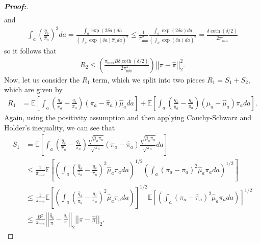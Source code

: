 \documentclass[11pt,twoside]{article}
\theoremstyle{definition}
\theoremstyle{remark}
\begin{document}
\begin{proof}[\textbf{Proof:}]
\begin{align*}
\end{align*}
and
\begin{align*}
    \int_a \left(\frac{\widehat{q}_\delta}{\widehat{\pi}_a}\right)^2 da =   \frac{\int_a \exp(2 \delta a)  da}{\left(\int_a \exp(\delta a) \widehat{\pi}_a  da \right)^2} \leq \frac{1}{\pi_{\min}^2} \frac{\int_a \exp(2 \delta a) da}{\left(\int_a \exp(\delta a) da \right)^2} = \frac{\delta  \coth(\delta / 2)}{2 \pi_{\min}^2}
\end{align*}
so it follows that
\begin{align*}
    R_2 \leq   \left(\frac{\pi_{\max} B  \delta  \coth(\delta / 2)}{2 \pi^4_{\min}} \right)   \left| \left|\pi - \widehat{\pi} \right| \right|^2_2.
\end{align*}
Now, let us consider the $R_1$ term, which we split into two pieces $R_1 = S_1 + S_2$, which are given by
\begin{align*}
    R_1 &= \mathbb{E} \left[\int_a \left(\frac{\widehat{q}_\delta}{\widehat{\pi}_a} - \frac{q_\delta}{\pi_a} \right)(\pi_a - \widehat{\pi}_a) \widehat{\mu}_a da \right] + \mathbb{E} \left[\int_a \left(\frac{\widehat{q}_\delta}{\widehat{\pi}_a} - \frac{q_\delta}{\pi_a} \right) (\mu_a - \widehat{\mu}_a) \pi_a  da\right].
\end{align*}
Again, using the positivity assumption and then applying Cauchy-Schwarz and Holder's inequality, we can see that
\begin{align*}
    S_1 &= \mathbb{E} \left[\int_a \left(\frac{\widehat{q}_\delta}{\widehat{\pi}_a} - \frac{q_\delta}{\pi_a} \right) \frac{\sqrt{\widehat{\mu}_a \pi_a}}{\sqrt{\pi_a}} (\pi_a - \widehat{\pi}_a)  \frac{\sqrt{\widehat{\mu}_a \pi_a}}{\sqrt{\pi_a}} da \right] \\
    &\leq \frac{1}{\pi_{\min}}\mathbb{E} \left[\left(\int_a \left(\frac{\widehat{q}_\delta}{\widehat{\pi}_a} - \frac{q_\delta}{\pi_a} \right)^2 \widehat{\mu}_a \pi_a da \right)^{1/2} \left( \int_a (\pi_a - \widehat{\pi}_a)^2   \widehat{\mu}_a \pi_a da \right)^{1/2} \right] \\
    &\leq \frac{1}{\pi_{\min}}\mathbb{E} \left[\left(\int_a \left(\frac{\widehat{q}_\delta}{\widehat{\pi}_a} - \frac{q_\delta}{\pi_a} \right)^2 \widehat{\mu}_a \pi_a da \right)\right]^{1/2} \mathbb{E} \left[ \left( \int_a (\pi_a - \widehat{\pi}_a)^2   \widehat{\mu}_a \pi_a da \right) \right]^{1/2} \\
    &\leq \frac{B^2}{\pi_{\min}} \left| \left|\frac{\widehat{q}_\delta}{\widehat{\pi}} - \frac{q_\delta}{\pi} \right| \right|_2 \left| \left|\pi - \widehat{\pi} \right| \right|_2.

\end{align*}
\end{proof}
\end{document}
